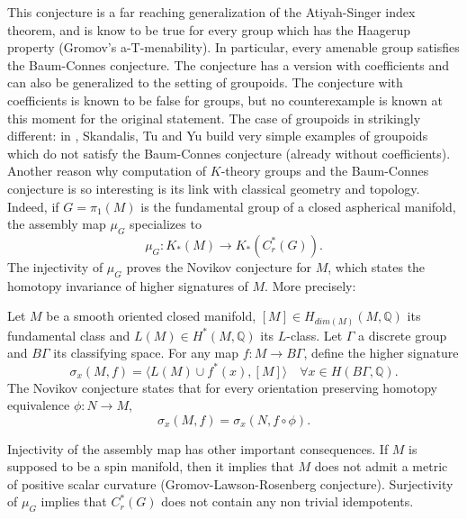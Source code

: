 This conjecture is a far reaching generalization of the Atiyah-Singer index theorem, and is know to be true for every group which has the Haagerup property (Gromov's a-T-menability). In particular, every amenable group satisfies the Baum-Connes conjecture. The conjecture has a version with coefficients and can also be generalized to the setting of groupoids. The conjecture with coefficients is known to be false for groups, but no counterexample is known at this moment for the original statement. The case of groupoids in strikingly different: in \cite{SkTuYu}, Skandalis, Tu and Yu build very simple examples of groupoids which do not satisfy the Baum-Connes conjecture (already without coefficients).\\

Another reason why computation of $K$-theory groups and the Baum-Connes conjecture is so interesting is its link with classical geometry and topology. Indeed, if $G=\pi_1(M)$ is the fundamental group of a closed aspherical manifold, the assembly map $\mu_G$ specializes to 
\[\mu_G : K_*(M)\rightarrow K_*(C^*_r(G)).\]
The injectivity of $\mu_G$ proves the Novikov conjecture for $M$, which states the homotopy invariance of higher signatures of $M$. More precisely:

\begin{conjecture} Let $M$ be a smooth oriented closed manifold, 
$[M]\in H_{dim(M)}(M,\mathbb Q)$ its fundamental class and
$ L(M)\in H^{*}(M,\mathbb Q)$ its $L$-class. Let $\Gamma$ a discrete group and $B\Gamma$ its classifying space. 
For any map $f: M \rightarrow B\Gamma$, define the higher signature 
\[\sigma_x(M,f) = \langle L(M)\cup f^*(x),[M] \rangle \quad \forall x \in H(B\Gamma, \mathbb Q).\]
The Novikov conjecture states that for every orientation preserving homotopy equivalence $\phi : N\rightarrow M$,
\[\sigma_x(M,f)= \sigma_x(N,f\circ \phi).\]
\end{conjecture}

Injectivity of the assembly map has other important consequences. If $M$ is supposed to be a spin manifold, then it implies that $M$ does not admit a metric of positive scalar curvature (Gromov-Lawson-Rosenberg conjecture). Surjectivity of $\mu_G$ implies that $C^*_r(G)$ does not contain any non trivial idempotents.

